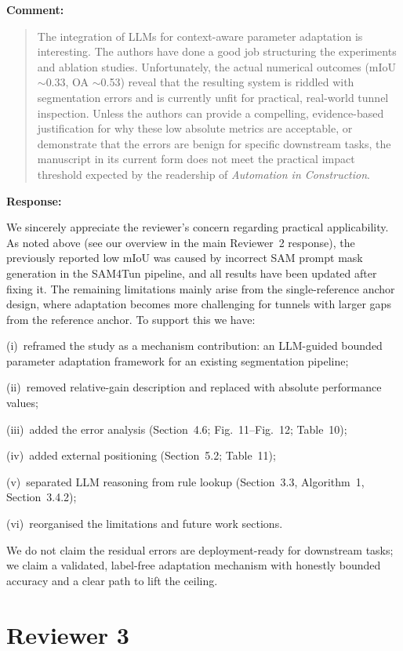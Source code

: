 \documentclass[11pt,a4paper]{article}
\newcommand{\MSErrorCompositionTable}{Table~10}
\newcommand{\MSSOTATable}{Table~11}
\newcommand{\MSErrorMechanismFigure}{Fig.~11}
\newcommand{\MSErrorMapFigure}{Fig.~12}
\newenvironment{commentblock}{%
  \par\smallskip\noindent\textbf{Comment:}\par
  \begin{quote}\itshape\color{black}
}{%
  \end{quote}\smallskip
}
\newenvironment{responseblock}{%
  \par\smallskip\noindent\textbf{Response:}\par
  \begingroup\color{responsegreen}
}{%
  \endgroup\smallskip
}
\begin{document}
\begin{commentblock}
The integration of LLMs for context-aware parameter adaptation is interesting. The authors have done a good job structuring the experiments and ablation studies. Unfortunately, the actual numerical outcomes (mIoU $\sim$0.33, OA $\sim$0.53) reveal that the resulting system is riddled with segmentation errors and is currently unfit for practical, real-world tunnel inspection. Unless the authors can provide a compelling, evidence-based justification for why these low absolute metrics are acceptable, or demonstrate that the errors are benign for specific downstream tasks, the manuscript in its current form does not meet the practical impact threshold expected by the readership of \emph{Automation in Construction}.
\end{commentblock}
\begin{responseblock}
We sincerely appreciate the reviewer’s concern regarding practical applicability. As noted above (see our overview in the main Reviewer~2 response), the previously reported low mIoU was caused by incorrect SAM prompt mask generation in the SAM4Tun pipeline, and all results have been updated after fixing it. The remaining limitations mainly arise from the single-reference anchor design, where adaptation becomes more challenging for tunnels with larger gaps from the reference anchor. To support this we have:

(i)~reframed the study as a mechanism contribution: an LLM-guided bounded parameter adaptation framework for an existing segmentation pipeline; 

(ii)~removed relative-gain description and replaced with absolute performance values;

(iii)~added the error analysis (Section~4.6; \MSErrorMechanismFigure--\MSErrorMapFigure; \MSErrorCompositionTable); 

(iv)~added external positioning (Section~5.2; \MSSOTATable);

(v)~separated LLM reasoning from rule lookup (Section~3.3, Algorithm~1, Section~3.4.2); 

(vi)~reorganised the limitations and future work sections.

We do not claim the residual errors are deployment-ready for downstream tasks; we claim a validated, label-free adaptation mechanism with honestly bounded accuracy and a clear path to lift the ceiling.
\end{responseblock}

\section*{Reviewer 3}
\end{document}
